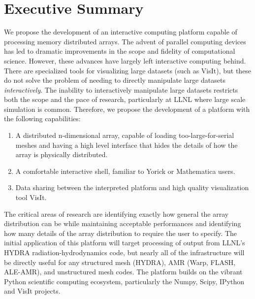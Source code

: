 \documentclass[letterpaper,12pt]{article}
\begin{document}

\setlength{\parindent}{15pt}
\section*{Executive Summary }
We propose the development of an interactive computing platform capable of processing memory distributed arrays.  The advent of parallel computing devices has led to dramatic improvements in the scope and fidelity of computational science.  However, these advances have largely left interactive computing behind.  There are specialized tools for visualizing large datasets (such as VisIt\cite{VisIt}), but these do not solve the problem of needing to directly manipulate large datasets \emph{interactively}.  The inability to interactively manipulate large datasets restricts both the scope and the pace of research, particularly at LLNL where large scale simulation is common.  Therefore, we propose the development of a platform with the following capabilities:

\begin{enumerate}
	\item A distributed n-dimensional array, capable of loading too-large-for-serial meshes and having a high level interface that hides the details of how the array is physically distributed.

	\item A comfortable interactive shell, familiar to Yorick or Mathematica users.

	\item Data sharing between the interpreted platform and high quality visualization tool VisIt.
\end{enumerate}

The critical areas of research are identifying exactly how general the array distribution can be while maintaining acceptable performances and identifying how many details of the array distribution to require the user to specify.  The initial application of this platform will target processing of output from LLNL's HYDRA\cite{Marinak2001} radiation-hydrodynamics code, but nearly all of the infrastructure will be directly useful for any structured mesh (HYDRA), AMR (Warp\cite{Grote2005}, FLASH\cite{flash}, ALE-AMR\cite{Koniges2010}), and unstructured mesh codes.  The platform builds on the vibrant Python scientific computing ecosystem, particularly the Numpy\cite{Oliphant2006}, Scipy\cite{numpyscipy}, IPython\cite{ipython} and VisIt projects.
\end{document}
